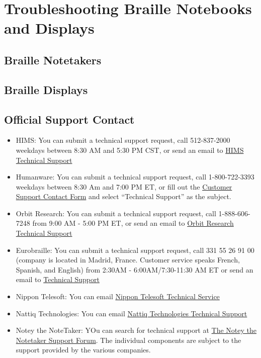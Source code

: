 \documentclass[12pt,letterpaper,twoside]{extreport}
\begin{document}
\begin{appendices}
\hypertarget{trouble2}{}\chapter{Troubleshooting Braille Notebooks and Displays}\label{trouble2}
\hypertarget{notebook2}{}\section{Braille Notetakers}\label{notebook}

\hypertarget{display2}{}\section{Braille Displays}\label{display2}

\hypertarget{report2}{}\section{Official Support Contact}\label{report2}
\begin{itemize}[letmargin=*]
\item HIMS: You can submit a technical support request, call 512-837-2000 weekdays between 8:30 AM and 5:30 PM CST, or send an email to \href{support@hims-inc.com}{HIMS Technical Support}
\item Humanware: You can submit a technical support request, call 1-800-722-3393 weekdays between 8:30 Am and 7:00 PM ET, or fill out the \href{https://store.humanware.com/hus/contact/}{Customer Support Contact Form} and select ``Technical Support'' as the subject. 
\item Orbit Research: You can submit a technical support request, call 1-888-606-7248 from 9:00 AM - 5:00 PM ET, or send an email to \href{techsupport@orbitresearch.com}{Orbit Research Technical Support}
\item Eurobraille: You can submit a technical support request, call 331 55 26 91 00 (company is located in Madrid, France. Customer service speaks French, Spanish, and English) from 2:30AM - 6:00AM/7:30-11:30 AM ET or send an email to \href{ contact@eurobraille.fr}{Technical Support}
\item Nippon Telesoft: You can email \href{ts-email@telesoft.co.jp}{Nippon Telesoft Technical Service}
\item Nattiq Technologies: You can email \href{info@nattiq.com}{Nattiq Technologies Technical Support}
\item Notey the NoteTaker: YOu can search for technical support at \href{https://notey-project.com/2023/03/31/notey-forum-tech-support/}{The Notey the Notetaker Support Forum}. The individual components are subject to the support provided by the various companies. 

\end{itemize}
\end{appendices}
\end{document}
